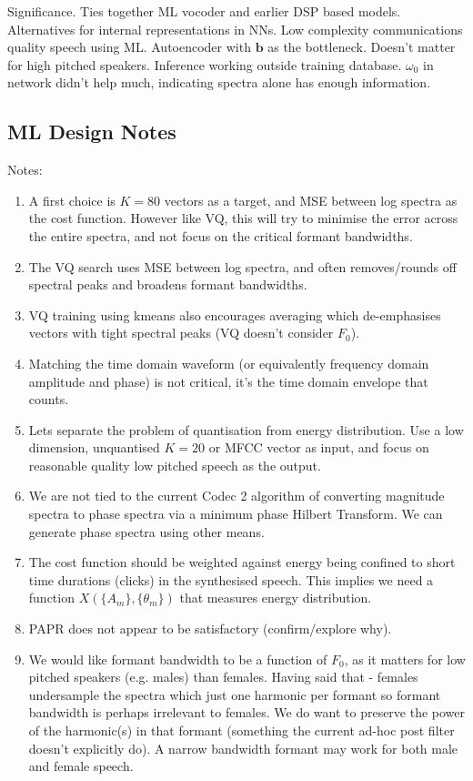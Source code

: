 \documentclass{article}
\begin{document}
Significance. Ties together ML vocoder and earlier DSP based models.  Alternatives for internal representations in NNs.  Low complexity communications quality speech using ML. Autoencoder with $\mathbf{b}$ as the bottleneck. Doesn't matter for high pitched speakers. Inference working outside training database. $\omega_0$ in network didn't help much, indicating spectra alone has enough information. 

\subsection{ML Design Notes}

Notes:
\begin{enumerate}
\item A first choice is $K=80$ vectors as a target, and MSE between log spectra as the cost function.  However like VQ, this will try to minimise the error across the entire spectra, and not focus on the critical formant bandwidths.
\item The VQ search uses MSE between log spectra, and often removes/rounds off spectral peaks and broadens formant bandwidths.  
\item VQ training using kmeans also encourages averaging which de-emphasises vectors with tight spectral peaks (VQ doesn't consider $F_0$).
\item Matching the time domain waveform (or equivalently frequency domain amplitude and phase) is not critical, it's the time domain envelope that counts.
\item Lets separate the problem of quantisation from energy distribution.  Use a low dimension, unquantised $K=20$ or MFCC vector as input, and focus on reasonable quality low pitched speech as the output.
\item We are not tied to the current Codec 2 algorithm of converting magnitude spectra to phase spectra via a minimum phase Hilbert Transform.  We can generate phase spectra using other means.
\item The cost function should be weighted against energy being confined to short time durations (clicks) in the synthesised speech.  This implies we need a function $X(\{A_m\},\{\theta_m\})$ that measures energy distribution.
\item PAPR does not appear to be satisfactory (confirm/explore why).
\item We would like formant bandwidth to be a function of $F_0$, as it matters for low pitched speakers (e.g. males) than females.  Having said that - females undersample the spectra which just one harmonic per formant so formant bandwidth is perhaps irrelevant to females.  We do want to preserve the power of the harmonic(s) in that formant (something the current ad-hoc post filter doesn't explicitly do).  A narrow bandwidth formant may work for both male and female speech.

\end{enumerate}
\end{document}

